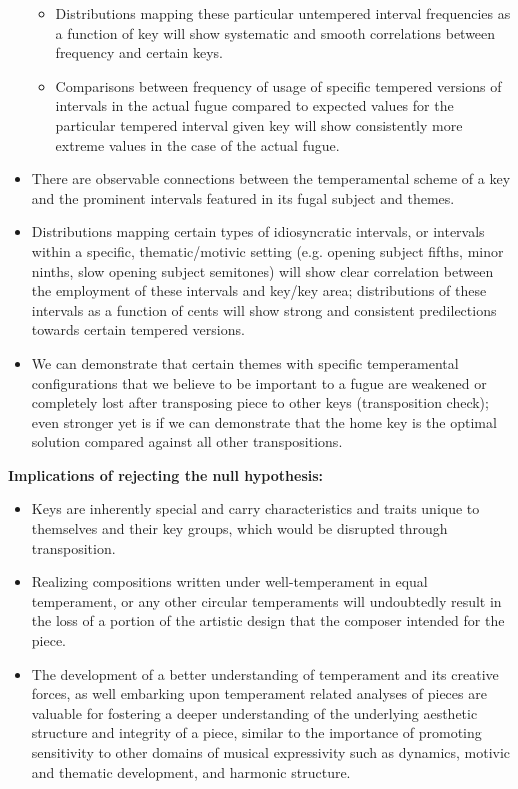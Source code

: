 \begin{itemize}
  \begin{itemize}
  \tightlist
  \item
    Distributions mapping these particular untempered interval
    frequencies as a function of key will show systematic and smooth
    correlations between frequency and certain keys.
  \item
    Comparisons between frequency of usage of specific tempered versions
    of intervals in the actual fugue compared to expected values for the
    particular tempered interval given key will show consistently more
    extreme values in the case of the actual fugue.
  \end{itemize}
\item
  There are observable connections between the temperamental scheme of a
  key and the prominent intervals featured in its fugal subject and
  themes.
\item
  Distributions mapping certain types of idiosyncratic intervals, or
  intervals within a specific, thematic/motivic setting (e.g. opening
  subject fifths, minor ninths, slow opening subject semitones) will
  show clear correlation between the employment of these intervals and
  key/key area; distributions of these intervals as a function of cents
  will show strong and consistent predilections towards certain tempered
  versions.
\item
  We can demonstrate that certain themes with specific temperamental
  configurations that we believe to be important to a fugue are weakened
  or completely lost after transposing piece to other keys
  (transposition check); even stronger yet is if we can demonstrate that
  the home key is the optimal solution compared against all other
  transpositions.
\end{itemize}

\textbf{Implications of rejecting the null hypothesis:}

\begin{itemize}
\tightlist
\item
  Keys are inherently special and carry characteristics and traits
  unique to themselves and their key groups, which would be disrupted
  through transposition.
\item
  Realizing compositions written under well-temperament in equal
  temperament, or any other circular temperaments will undoubtedly
  result in the loss of a portion of the artistic design that the
  composer intended for the piece.
\item
  The development of a better understanding of temperament and its
  creative forces, as well embarking upon temperament related analyses
  of pieces are valuable for fostering a deeper understanding of the
  underlying aesthetic structure and integrity of a piece, similar to
  the importance of promoting sensitivity to other domains of musical
  expressivity such as dynamics, motivic and thematic development, and
  harmonic structure.
\end{itemize}


